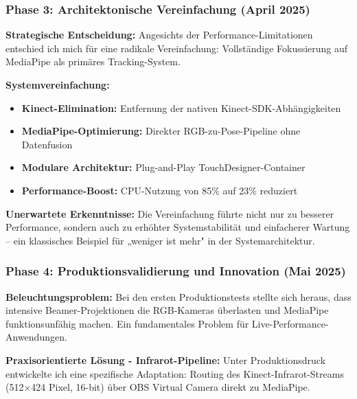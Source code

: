 \newpage

\subsubsection{Phase 3: Architektonische Vereinfachung (April 2025)}

\textbf{Strategische Entscheidung:}
Angesichts der Performance-Limitationen entschied ich mich für eine radikale Vereinfachung: Vollständige Fokussierung auf MediaPipe als primäres Tracking-System.

\textbf{Systemvereinfachung:}
\begin{itemize}
    \item \textbf{Kinect-Elimination:} Entfernung der nativen Kinect-SDK-Abhängigkeiten
    \item \textbf{MediaPipe-Optimierung:} Direkter RGB-zu-Pose-Pipeline ohne Datenfusion
    \item \textbf{Modulare Architektur:} Plug-and-Play TouchDesigner-Container
    \item \textbf{Performance-Boost:} CPU-Nutzung von 85\% auf 23\% reduziert
\end{itemize}

\textbf{Unerwartete Erkenntnisse:}
Die Vereinfachung führte nicht nur zu besserer Performance, sondern auch zu erhöhter Systemstabilität und einfacherer Wartung – ein klassisches Beispiel für „weniger ist mehr" in der Systemarchitektur.

\subsubsection{Phase 4: Produktionsvalidierung und Innovation (Mai 2025)}

\textbf{Beleuchtungsproblem:}
Bei den ersten Produktionstests stellte sich heraus, dass intensive Beamer-Projektionen die RGB-Kameras überlasten und MediaPipe funktionsunfähig machen. Ein fundamentales Problem für Live-Performance-Anwendungen.

\textbf{Praxisorientierte Lösung - Infrarot-Pipeline:}
Unter Produktionsdruck entwickelte ich eine spezifische Adaptation: Routing des Kinect-Infrarot-Streams (512×424 Pixel, 16-bit) über OBS Virtual Camera direkt zu MediaPipe.

